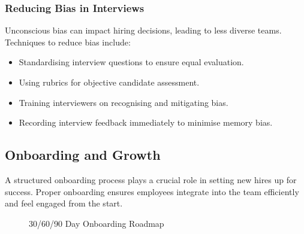 \subsubsection{Reducing Bias in Interviews}

Unconscious bias can impact hiring decisions, leading to less diverse teams. Techniques to reduce bias include:

\begin{itemize}
    \item Standardising interview questions to ensure equal evaluation.
    \item Using rubrics for objective candidate assessment.
    \item Training interviewers on recognising and mitigating bias.
    \item Recording interview feedback immediately to minimise memory bias.
\end{itemize}

\subsection{Onboarding and Growth}

A structured onboarding process plays a crucial role in setting new hires up for success. Proper onboarding ensures employees integrate into the team efficiently and feel engaged from the start.

\begin{figure}[h]
    \centering
    \caption{30/60/90 Day Onboarding Roadmap}
    \label{fig:onboarding_roadmap}
\end{figure}

